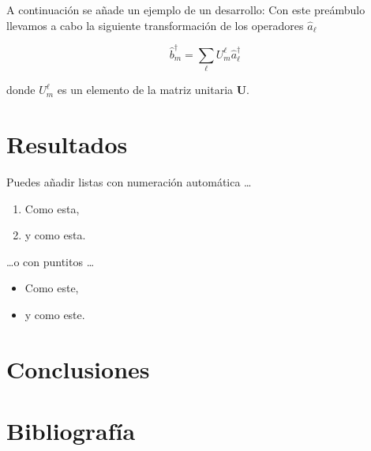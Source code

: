 \documentclass[12pt]{article}
\begin{document}
A continuación se añade un ejemplo de un desarrollo:
Con este preámbulo llevamos a cabo la siguiente transformación de los operadores $\hat{a}_{\ell}$

\begin{equation}
\hat{b}_{m}^{\dagger}=\sum_{\ell}U_{m}^{\ell}\hat{a}_{\ell}^{\dagger}
\end{equation}

donde $U_{m}^{\ell}$ es un elemento de la matriz unitaria $\mathbf{U}$.



\section{Resultados}

Puedes añadir listas con numeración automática \dots

\begin{enumerate}
\item Como esta,
\item y como esta.
\end{enumerate}
\dots o con puntitos \dots
\begin{itemize}
\item Como este,
\item y como este.
\end{itemize}



\section{Conclusiones}

\section{Bibliografía}
\end{document}
